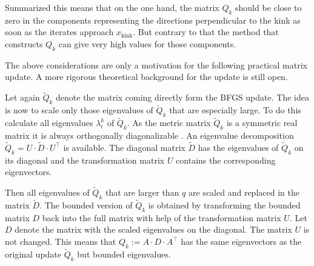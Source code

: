 Summarized this means that on the one hand, the matrix \(Q_k\) should be close to zero in the components representing the directions perpendicular to the kink as soon as the iterates approach \(x_{\text{kink}}\). But contrary to that the method that constructs \(Q_k\) can give very high values for those components.

\begin{remark}
	The above considerations are only a motivation for the following practical matrix update. A more rigorous theoretical background for the update is still open.
\end{remark}

Let again \(\tilde{Q}_k\) denote the matrix coming directly form the BFGS update.
The idea is now to scale only those eigenvalues of \(\tilde{Q}_k\) that are especially large.
To do this calculate all eigenvalues \(\lambda^k_i\) of \(\tilde{Q}_k\).
As the metric matrix \(\tilde{Q}_k\) is a symmetric real matrix it is  always orthogonally diagonalizable \cite[Corollary 18.18 p. 282]{Liesen2015}. An eigenvalue decomposition \(\tilde{Q}_k = U\cdot \tilde{D} \cdot U^{\top}\) is available. The diagonal matrix \(\tilde{D}\) has the eigenvalues of \(\tilde{Q}_k\) on its diagonal and the transformation matrix \(U\) contains the corresponding eigenvectors.



Then all eigenvalues of \(\tilde{Q}_k\) that are larger than \(q\) are scaled and replaced in the matrix \(\tilde{D}\). The bounded version of \(\tilde{Q}_k\) is obtained by transforming the bounded matrix \(D\) back into the full matrix with help of the transformation matrix \(U\).
Let \(D\) denote the matrix with the scaled eigenvalues on the diagonal. The matrix \(U\) is not changed. This means that \({Q}_k := A\cdot{D}\cdot A^{\top}\) has the same eigenvectors as the original update \(\tilde{Q}_k\) but bounded eigenvalues.



